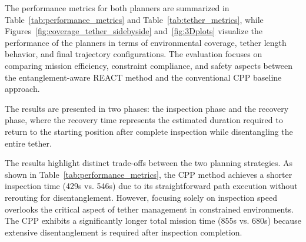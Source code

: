 



The performance metrics for both planners are summarized in Table~\ref{tab:performance_metrics} and Table~\ref{tab:tether_metrics}, while Figures~\ref{fig:coverage_tether_sidebyside} and~\ref{fig:3Dplots} visualize the performance of the planners in terms of environmental coverage, tether length behavior, and final trajectory configurations. The evaluation focuses on comparing mission efficiency, constraint compliance, and safety aspects between the entanglement-aware \ac{REACT} method and the conventional \ac{CPP} baseline approach.




The results are presented in two phases: the inspection phase and the recovery phase, where the recovery time represents the estimated duration required to return to the starting position after complete inspection while disentangling the entire tether.

The results highlight distinct trade-offs between the two planning strategies. As shown in Table~\ref{tab:performance_metrics}, the \ac{CPP} method achieves a shorter inspection time (429s vs. 546s) due to its straightforward path execution without rerouting for disentanglement. However, focusing solely on inspection speed overlooks the critical aspect of tether management in constrained environments. The \ac{CPP} exhibits a significantly longer total mission time (855s vs. 680s) because extensive disentanglement is required after inspection completion.

